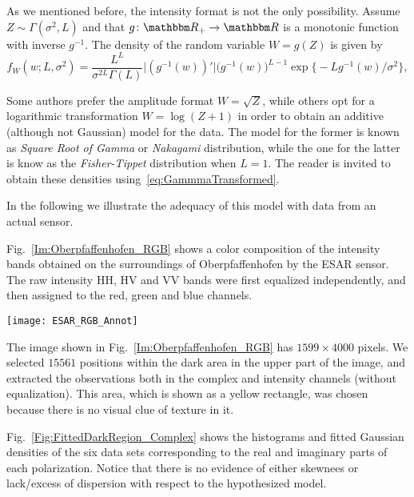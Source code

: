 As we mentioned before, the intensity format is not the only possibility.
Assume $Z\sim\Gamma(\sigma^2,L)$ and that $g\colon\mathbbm R_+ \to \mathbbm R$ is a monotonic function with inverse $g^{-1}$.
The density of the random variable $W = g(Z)$ is given by 
\begin{equation}
f_W(w;L,\sigma^2) = \frac{L^L}{\sigma^{2L}\Gamma(L)} \big|(g^{-1}(w))'\big| \big(g^{-1}(w)\big)^{L-1} 
	\exp\big\{ -L g^{-1}(w) / \sigma^2
	\big\},
	\label{eq:GammmaTransformed}
\end{equation}

Some authors\cite{IterativeWeightedMaximumLikelihoodDenoising} prefer the amplitude format $W=\sqrt{Z}$, while others\cite{Santos2017} opt for a logarithmic transformation $W=\log(Z+1)$ in order to obtain an additive (although not Gaussian) model for the data.
The model for the former is known as \textit{Square Root of Gamma} or \textit{Nakagami} distribution,
while the one for the latter is know as the \textit{Fisher-Tippet} distribution when $L=1$.
The reader is invited to obtain these densities using~\eqref{eq:GammmaTransformed}.

In the following we illustrate the adequacy of this model with data from an actual sensor.

Fig.~\ref{Im:Oberpfaffenhofen_RGB} shows a color composition of the intensity bands obtained on the surroundings of Oberpfaffenhofen by the ESAR sensor.
The raw intensity HH, HV and VV bands were first equalized independently, and then assigned to the red, green and blue channels.

\begin{figure*}
\centering
\texttt{[image: ESAR\_RGB\_Annot]}
\caption{Color composition of the equalized intensity bands of an ESAR image over Oberpfaffenhofen}\label{Im:Oberpfaffenhofen_RGB}
\end{figure*}

The image shown in Fig.~\ref{Im:Oberpfaffenhofen_RGB} has $1599\times4000$ pixels.
We selected $15561$ positions within the dark area in the upper part of the image, and extracted the observations both in the complex and intensity channels (without equalization).
This area, which is shown as a yellow rectangle, was chosen because there is no visual clue of texture in it.

Fig.~\ref{Fig:FittedDarkRegion_Complex} shows the histograms and fitted Gaussian densities of the six data sets corresponding to the real and imaginary parts of each polarization.
Notice that there is no evidence of either skewnees or lack/excess of dispersion with respect to the hypothesized model.

